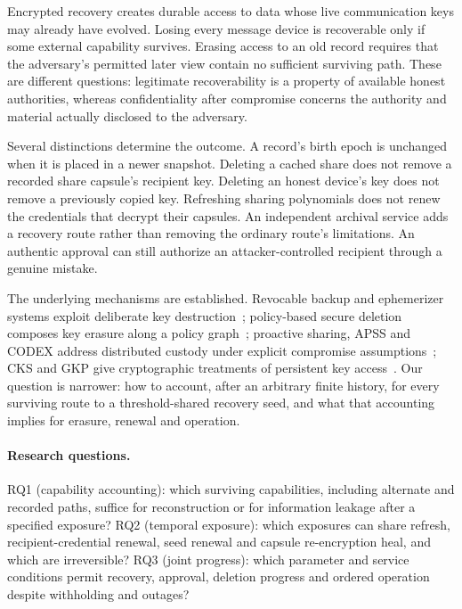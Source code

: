 \documentclass[pdflatex,sn-mathphys-num,twocolumn]{sn-jnl}
\theoremstyle{plain}
\theoremstyle{definition}
\begin{document}
Encrypted recovery creates durable access to data whose live communication keys may already have evolved. Losing every message device is recoverable only if some external capability survives. Erasing access to an old record requires that the adversary's permitted later view contain no sufficient surviving path. These are different questions: legitimate recoverability is a property of available honest authorities, whereas confidentiality after compromise concerns the authority and material actually disclosed to the adversary.

Several distinctions determine the outcome. A record's birth epoch is unchanged when it is placed in a newer snapshot. Deleting a cached share does not remove a recorded share capsule's recipient key. Deleting an honest device's key does not remove a previously copied key. Refreshing sharing polynomials does not renew the credentials that decrypt their capsules. An independent archival service adds a recovery route rather than removing the ordinary route's limitations. An authentic approval can still authorize an attacker-controlled recipient through a genuine mistake.

The underlying mechanisms are established. Revocable backup and ephemerizer systems exploit deliberate key destruction~\cite{boneh1996,perlman2007}; policy-based secure deletion composes key erasure along a policy graph~\cite{cachin2013}; proactive sharing, APSS and CODEX address distributed custody under explicit compromise assumptions~\mbox{\cite{ostrovsky1991,herzberg1995,zhou2005,marsh2004}}; CKS and GKP give cryptographic treatments of persistent key access~\cite{dodis2024,dodisstandard2024,backendal2026}. Our question is narrower: how to account, after an arbitrary finite history, for every surviving route to a threshold-shared recovery seed, and what that accounting implies for erasure, renewal and operation.

\paragraph{Research questions.}
RQ1 (capability accounting): which surviving capabilities, including alternate and recorded paths, suffice for reconstruction or for information leakage after a specified exposure? RQ2 (temporal exposure): which exposures can share refresh, recipient-credential renewal, seed renewal and capsule re-encryption heal, and which are irreversible? RQ3 (joint progress): which parameter and service conditions permit recovery, approval, deletion progress and ordered operation despite withholding and outages?
\end{document}
